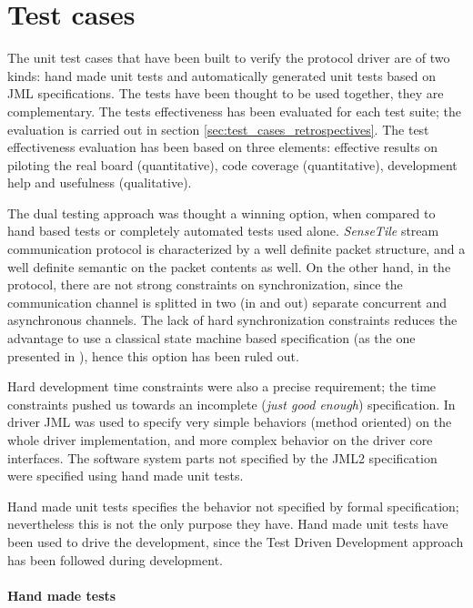 \documentclass{article} \usepackage{times}
\newcommand{\ST}{\emph{SenseTile}\xspace}
\begin{document}
\section{Test cases}
\label{sec:test_cases}

The unit test cases that have been built to verify the protocol driver
are of two kinds: hand made unit tests and automatically generated
unit tests based on JML specifications.  The tests have been thought
to be used together, they are complementary.  The tests effectiveness
has been evaluated for each test suite; the evaluation is carried out
in section \ref{sec:test_cases_retrospectives}.  The test
effectiveness evaluation has been based on three elements: effective
results on piloting the real board (quantitative), code coverage
(quantitative), development help and usefulness (qualitative).

The dual testing approach was thought a winning option, when compared
to hand based tests or completely automated tests used alone.  \ST
stream communication protocol is characterized by a well definite
packet structure, and a well definite semantic on the packet contents
as well.  On the other hand, in the protocol, there are not strong
constraints on synchronization, since the communication channel is
splitted in two (in and out) separate concurrent and asynchronous
channels.  The lack of hard synchronization constraints reduces the
advantage to use a classical state machine based specification (as the
one presented in \cite{Hubbers2004}), hence this option has been ruled
out.

Hard development time constraints were also a precise requirement; the
time constraints pushed us towards an incomplete (\emph{just good
  enough}) specification.  In \STSB driver JML was used to specify
very simple behaviors (method oriented) on the whole driver
implementation, and more complex behavior on the driver core
interfaces.  The software system parts not specified by the JML2
specification were specified using hand made unit tests.

Hand made unit tests specifies the behavior not specified by formal
specification; nevertheless this is not the only purpose they have.
Hand made unit tests have been used to drive the development, since
the Test Driven Development approach\cite{beck2003test} has been
followed during development.

\paragraph*{Hand made tests}
\end{document}

